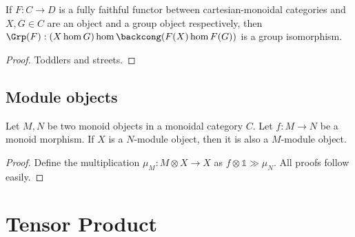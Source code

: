 \begin{lemma}
  \label{0-full-faithful-grp-hom}
  \leanok

  If $F : C \to D$ is a fully faithful functor between cartesian-monoidal categories
  and $X, G \in C$ are an object and a group object respectively,
  then $\Grp(F) : (X \hom G) \hom \backcong (F(X) \hom F(G))$ is a group isomorphism.
\end{lemma}
\begin{proof}
  \leanok

  Toddlers and streets.
\end{proof}


\subsection{Module objects}


\begin{proposition}
  \label{0-comap-mod}

  Let $M, N$ be two monoid objects in a monoidal category $C$.
  Let $f : M \to N$ be a monoid morphism.
  If $X$ is a $N$-module object, then it is also a $M$-module object.
\end{proposition}
\begin{proof}

  Define the multiplication $\mu_M : M \otimes X \to X$ as $f \otimes \mathbb 1 \gg \mu_N$.
  All proofs follow easily.
\end{proof}


\section{Tensor Product}


